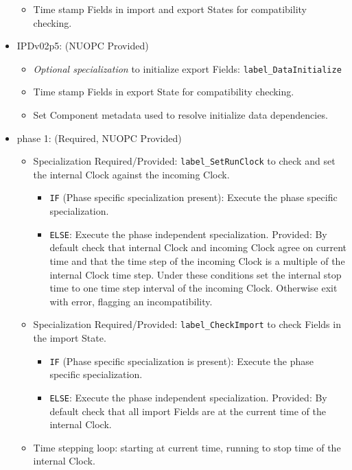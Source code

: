 \begin{itemize}
\begin{itemize}
  \item Time stamp Fields in import and export States for compatibility checking.
  \end{itemize}    
\item IPDv02p5: ({\sc NUOPC Provided})
  \begin{itemize}
  \item {\it Optional specialization} to initialize export Fields: {\tt label\_DataInitialize}
  \item Time stamp Fields in export State for compatibility checking.
  \item Set Component metadata used to resolve initialize data dependencies.
  \end{itemize}    
\end{itemize}

\begin{itemize}
\item phase 1: ({\sc Required, NUOPC Provided})
  \begin{itemize}
  \item {\sc Specialization Required/Provided}: {\tt label\_SetRunClock} to check and set the internal Clock against the incoming Clock.
  \begin{itemize}
  \item {\tt IF} (Phase specific specialization present): Execute the phase specific specialization.
  \item {\tt ELSE}: Execute the phase independent specialization. {\sc Provided}: By default check that internal Clock and incoming Clock agree on current time and that the time step of the incoming Clock is a multiple of the internal Clock time step. Under these conditions set the internal stop time to one time step interval of the incoming Clock. Otherwise exit with error, flagging an incompatibility.
  \end{itemize}
  \item {\sc Specialization Required/Provided}: {\tt label\_CheckImport} to check Fields in the import State.
  \begin{itemize}
  \item {\tt IF} (Phase specific specialization is present): Execute the phase specific specialization.
  \item {\tt ELSE}: Execute the phase independent specialization. {\sc Provided}: By default check that all import Fields are at the current time of the internal Clock.
  \end{itemize}
  \item Time stepping loop: starting at current time, running to stop time of the internal Clock.

\end{itemize}
\end{itemize}
